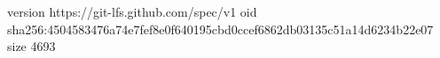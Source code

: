 version https://git-lfs.github.com/spec/v1
oid sha256:4504583476a74e7fef8e0f640195cbd0ccef6862db03135c51a14d6234b22e07
size 4693
